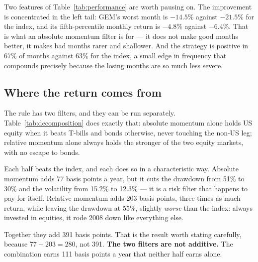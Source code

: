 \documentclass[11pt,a4paper]{article}
\let\oldsubsection\subsection
\renewcommand{\subsection}{\FloatBarrier\oldsubsection}
\begin{document}
\begin{table}[htbp]
  \centering
  \caption{Performance, January 1971 to July 2026.}
  \label{tab:performance}
  
\end{table}

Two features of Table~\ref{tab:performance} are worth pausing on. The
improvement is concentrated in the left tail: GEM's worst month is $-14.5$\%
against $-21.5$\% for the index, and its fifth-percentile monthly return is
$-4.8$\% against $-6.4$\%. That is what an absolute momentum filter is for --- it
does not make good months better, it makes bad months rarer and shallower. And
the strategy is positive in 67\% of months against 63\% for the index, a small
edge in frequency that compounds precisely because the losing months are so
much less severe.

\subsection{Where the return comes from}

The rule has two filters, and they can be run separately.
Table~\ref{tab:decomposition} does exactly that: absolute momentum alone holds
US equity when it beats T-bills and bonds otherwise, never touching the non-US
leg; relative momentum alone always holds the stronger of the two equity
markets, with no escape to bonds.

\begin{table}[!ht]
  \centering
  \caption{Decomposition: what each momentum filter contributes.}
  \label{tab:decomposition}
  
\end{table}

Each half beats the index, and each does so in a characteristic way. Absolute
momentum adds 77 basis points a year, but it cuts the drawdown from 51\% to
30\% and the volatility from 15.2\% to 12.3\% --- it is a risk filter that
happens to pay for itself. Relative momentum adds 203 basis points, three times
as much return, while leaving the drawdown at 55\%, slightly \emph{worse} than
the index: always invested in equities, it rode 2008 down like everything else.

Together they add 391 basis points. That is the result worth stating carefully,
because $77 + 203 = 280$, not 391. \textbf{The two filters are not additive.}
The combination earns 111 basis points a year that neither half earns alone.
\end{document}
